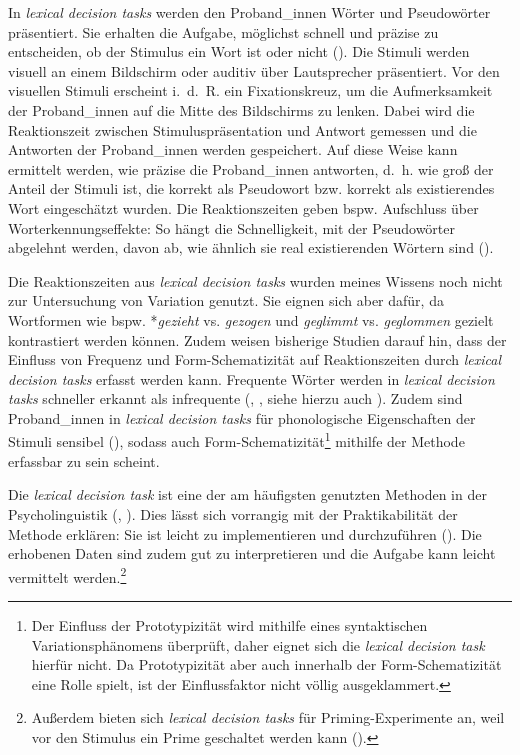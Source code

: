 In \textit{lexical decision tasks} werden den Proband\_innen Wörter und Pseudowörter präsentiert. Sie erhalten die Aufgabe, möglichst schnell und präzise zu entscheiden, ob der Stimulus ein Wort ist oder nicht (\cite[95]{Baayen.2014}). Die Stimuli werden visuell an einem Bildschirm oder auditiv über Lautsprecher präsentiert. Vor den visuellen Stimuli erscheint i.~d.~R. ein Fixationskreuz, um die Aufmerksamkeit der Proband\_innen auf die Mitte des Bildschirms zu lenken. Dabei wird die Reaktionszeit zwischen Stimuluspräsentation und Antwort gemessen und die Antworten der Proband\_innen werden gespeichert. Auf diese Weise kann ermittelt werden, wie präzise die Proband\_innen antworten, d.~h. wie groß der Anteil der Stimuli ist, die korrekt als Pseudowort bzw. korrekt als existierendes Wort eingeschätzt wurden. Die Reaktionszeiten geben bspw. Aufschluss über Worterkennungseffekte: So hängt die Schnelligkeit, mit der Pseudowörter abgelehnt werden, davon ab, wie ähnlich sie real existierenden Wörtern sind (\cite{Barca.2012}).  



Die Reaktionszeiten aus \textit{lexical decision tasks} wurden meines Wissens noch nicht zur Untersuchung von Variation genutzt. Sie eignen sich aber dafür, da Wortformen wie bspw. *\textit{gezieht} vs. \textit{gezogen} und \textit{geglimmt} vs. \textit{geglommen} gezielt kontrastiert werden können. Zudem weisen bisherige Studien darauf hin, dass der Einfluss von Frequenz und Form-Schematizität auf Reaktionszeiten durch \textit{lexical decision tasks} erfasst werden kann. Frequente Wörter werden in \textit{lexical decision tasks} schneller erkannt als infrequente (\cite[489--491]{Rubenstein.1970}, \cite[150--152]{Whaley.1978}, siehe hierzu auch ). Zudem sind Proband\_innen in \textit{lexical decision tasks} für phonologische Eigenschaften der Stimuli sensibel (\cite[6--7]{Keuleers.2010}), sodass auch Form-Schematizität\footnote{Der Einfluss der Prototypizität wird mithilfe eines syntaktischen Variationsphänomens überprüft, daher eignet sich die \textit{lexical decision task} hierfür nicht. Da Prototypizität aber auch innerhalb der Form-Schematizität eine Rolle spielt, ist der Einflussfaktor nicht völlig ausgeklammert.} mithilfe der Methode erfassbar zu sein scheint. 

Die \textit{lexical decision task} ist eine der am häufigsten genutzten Methoden in der Psycho\-linguistik (\cite[1]{Diependaele.2012}, \cite[95]{Baayen.2014}). Dies lässt sich vorrangig mit der Praktikabilität der Methode erklären: Sie ist leicht zu implementieren und durchzuführen (\cite[96]{Baayen.2014}). Die erhobenen Daten sind zudem gut zu interpretieren und die Aufgabe kann leicht vermittelt werden.\footnote{Außerdem bieten sich \textit{lexical decision tasks} für Priming-Experimente an, weil vor den Stimulus ein Prime geschaltet werden kann (\cite[46]{Jones.2012}).}  


